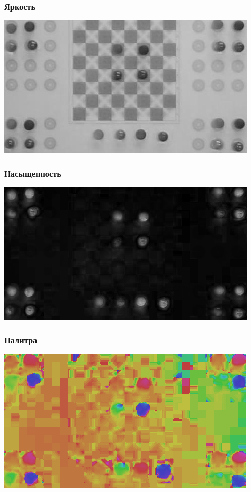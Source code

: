 \documentclass[24pt,pdf,hyperref={unicode}]{beamer}
\begin{document}
\begin{frame}\frametitle{Яркость}
\includegraphics[width=\textwidth]{Images/Checkers-light.png} 
\end{frame}

\begin{frame}\frametitle{Насыщенность}
\includegraphics[width=\textwidth]{Images/Checkers-sat.png} 
\end{frame}

\begin{frame}\frametitle{Палитра}
\includegraphics[width=\textwidth]{Images/Checkers-hue.png} 
\end{frame}
\end{document}

